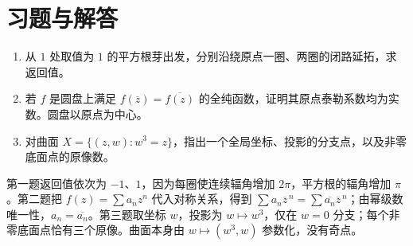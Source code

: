 \section{习题与解答}

\begin{enumerate}
 \item 从 $1$ 处取值为 $1$ 的平方根芽出发，分别沿绕原点一圈、两圈的闭路延拓，求返回值。
 \item 若 $f$ 是圆盘上满足 $f(\overline z)=\overline{f(z)}$ 的全纯函数，证明其原点泰勒系数均为实数。圆盘以原点为中心。
 \item 对曲面 $X=\{(z,w):w^3=z\}$，指出一个全局坐标、投影的分支点，以及非零底面点的原像数。
\end{enumerate}
\begin{solve}[解答]
第一题返回值依次为 $-1$、$1$，因为每圈使连续辐角增加 $2\pi$，平方根的辐角增加 $\pi$。第二题把 $f(z)=\sum a_nz^n$ 代入对称关系，得到 $\sum a_n\overline z^{\,n}=\sum\overline{a_n}\overline z^{\,n}$；由幂级数唯一性，$a_n=\overline{a_n}$。第三题取坐标 $w$，投影为 $w\mapsto w^3$，仅在 $w=0$ 分支；每个非零底面点恰有三个原像。曲面本身由 $w\mapsto(w^3,w)$ 参数化，没有奇点。
\end{solve}

